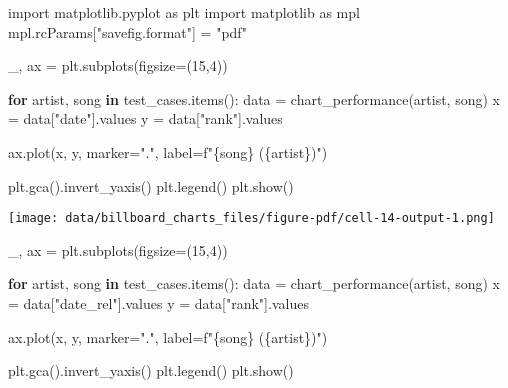 \documentclass[
  a4paper,
]{scrbook}
\newenvironment{Shaded}{\begin{snugshade}}{\end{snugshade}}
\newcommand{\ControlFlowTok}[1]{\textcolor[rgb]{0.00,0.23,0.31}{\textbf{#1}}}
\newcommand{\DecValTok}[1]{\textcolor[rgb]{0.68,0.00,0.00}{#1}}
\newcommand{\ImportTok}[1]{\textcolor[rgb]{0.00,0.46,0.62}{#1}}
\newcommand{\KeywordTok}[1]{\textcolor[rgb]{0.00,0.23,0.31}{\textbf{#1}}}
\newcommand{\NormalTok}[1]{\textcolor[rgb]{0.00,0.23,0.31}{#1}}
\newcommand{\OperatorTok}[1]{\textcolor[rgb]{0.37,0.37,0.37}{#1}}
\newcommand{\SpecialCharTok}[1]{\textcolor[rgb]{0.37,0.37,0.37}{#1}}
\newcommand{\SpecialStringTok}[1]{\textcolor[rgb]{0.13,0.47,0.30}{#1}}
\newcommand{\StringTok}[1]{\textcolor[rgb]{0.13,0.47,0.30}{#1}}
\begin{document}
\begin{Shaded}
\begin{Highlighting}[]
\ImportTok{import}\NormalTok{ matplotlib.pyplot }\ImportTok{as}\NormalTok{ plt}
\ImportTok{import}\NormalTok{ matplotlib }\ImportTok{as}\NormalTok{ mpl }
\NormalTok{mpl.rcParams[}\StringTok{"savefig.format"}\NormalTok{] }\OperatorTok{=} \StringTok{"pdf"}
\end{Highlighting}
\end{Shaded}

\begin{Shaded}
\begin{Highlighting}[]
\NormalTok{\_, ax }\OperatorTok{=}\NormalTok{ plt.subplots(figsize}\OperatorTok{=}\NormalTok{(}\DecValTok{15}\NormalTok{,}\DecValTok{4}\NormalTok{))}

\ControlFlowTok{for}\NormalTok{ artist, song }\KeywordTok{in}\NormalTok{ test\_cases.items():}
\NormalTok{    data }\OperatorTok{=}\NormalTok{ chart\_performance(artist, song)}
\NormalTok{    x }\OperatorTok{=}\NormalTok{ data[}\StringTok{"date"}\NormalTok{].values}
\NormalTok{    y }\OperatorTok{=}\NormalTok{ data[}\StringTok{"rank"}\NormalTok{].values}

\NormalTok{    ax.plot(x, y, marker}\OperatorTok{=}\StringTok{"."}\NormalTok{, label}\OperatorTok{=}\SpecialStringTok{f"}\SpecialCharTok{\{}\NormalTok{song}\SpecialCharTok{\}}\SpecialStringTok{ (}\SpecialCharTok{\{}\NormalTok{artist}\SpecialCharTok{\}}\SpecialStringTok{)"}\NormalTok{)}

\NormalTok{plt.gca().invert\_yaxis()}
\NormalTok{plt.legend()}
\NormalTok{plt.show()}
\end{Highlighting}
\end{Shaded}

\texttt{[image: data/billboard\_charts\_files/figure-pdf/cell-14-output-1.png]}

\begin{Shaded}
\begin{Highlighting}[]
\NormalTok{\_, ax }\OperatorTok{=}\NormalTok{ plt.subplots(figsize}\OperatorTok{=}\NormalTok{(}\DecValTok{15}\NormalTok{,}\DecValTok{4}\NormalTok{))}

\ControlFlowTok{for}\NormalTok{ artist, song }\KeywordTok{in}\NormalTok{ test\_cases.items():}
\NormalTok{    data }\OperatorTok{=}\NormalTok{ chart\_performance(artist, song)}
\NormalTok{    x }\OperatorTok{=}\NormalTok{ data[}\StringTok{"date\_rel"}\NormalTok{].values}
\NormalTok{    y }\OperatorTok{=}\NormalTok{ data[}\StringTok{"rank"}\NormalTok{].values}

\NormalTok{    ax.plot(x, y, marker}\OperatorTok{=}\StringTok{"."}\NormalTok{, label}\OperatorTok{=}\SpecialStringTok{f"}\SpecialCharTok{\{}\NormalTok{song}\SpecialCharTok{\}}\SpecialStringTok{ (}\SpecialCharTok{\{}\NormalTok{artist}\SpecialCharTok{\}}\SpecialStringTok{)"}\NormalTok{)}

\NormalTok{plt.gca().invert\_yaxis()}
\NormalTok{plt.legend()}
\NormalTok{plt.show()}
\end{Highlighting}
\end{Shaded}
\end{document}
